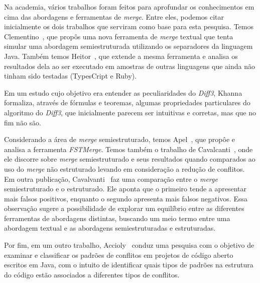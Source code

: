 Na academia, vários trabalhos foram feitos para aprofundar os conhecimentos em
cima das abordagens e ferramentas de \emph{merge}. Entre eles, podemos citar
inicialmente os dois trabalhos que serviram como base para esta pesquisa. Temos
Clementino~\cite{clem21}, que propôs uma nova ferramenta de \emph{merge}
textual que tenta simular uma abordagem semiestruturada utilizando os
separadores da linguagem Java. Também temos Heitor~\cite{heitor21}, que extende
a mesma ferramenta e analisa os resultados dela ao ser executado em amostras de
outras linguagens que ainda não tinham sido testadas (TypesCript e Ruby).

Em um estudo cujo objetivo era entender as peculiaridades do \emph{Diff3},
Khanna~\cite{khan07} formaliza, através de fórmulas e teoremas, algumas
propriedades particulares do algoritmo do \emph{Diff3}, que inicialmente
parecem ser intuitivas e corretas, mas que no fim não são.

Considerando a área de \emph{merge} semiestruturado, temos Apel~\cite{apel11},
que propôe e analisa a ferramenta \emph{FSTMerge}. Temos também o trabalho de
Cavalcanti~\cite{cavalcanti17}, onde ele discorre sobre \emph{merge}
semiestruturado e seus resultados quando comparados ao uso do \emph{merge} não
estruturado levando em consideração a redução de conflitos. Em outra
publicação, Cavalvanti~\cite{cavalcanti19} faz uma comparação entre o
\emph{merge} semiestruturado e o estruturado. Ele aponta que o primeiro tende a
apresentar mais falsos positivos, enquanto o segundo apresenta mais falsos
negativos. Essa observação sugere a possibilidade de explorar um equilíbrio
entre as diferentes ferramentas de abordagens distintas, buscando um meio termo
entre uma abordagem textual e as abordagens semiestruturadas e estruturadas.

Por fim, em um outro trabalho, Accioly~\cite{accioly18} conduz uma pesquisa com
o objetivo de examinar e classificar os padrões de conflitos em projetos de
código aberto escritos em Java, com o intuito de identificar quais tipos de
padrões na estrutura do código estão associados a diferentes tipos de
conflitos.

